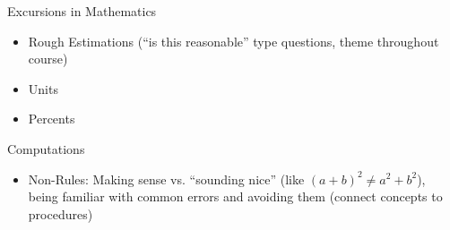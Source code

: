 \documentclass{ximera}
\begin{document}
\begin{objectives}
\begin{itemize}
	\end{itemize}
\item Excursions in Mathematics
	\begin{itemize}
	\item Rough Estimations (“is this reasonable” type questions, theme throughout course)  
	\item Units
	\item Percents
	\end{itemize}
\item Computations
	\begin{itemize}
	\item Non-Rules:  Making sense vs. “sounding nice” (like $(a+b)^2 \neq a^2+b^2$), being familiar with common errors and avoiding them (connect concepts to procedures) 
	\end{itemize}
\end{objectives}
\end{document}
